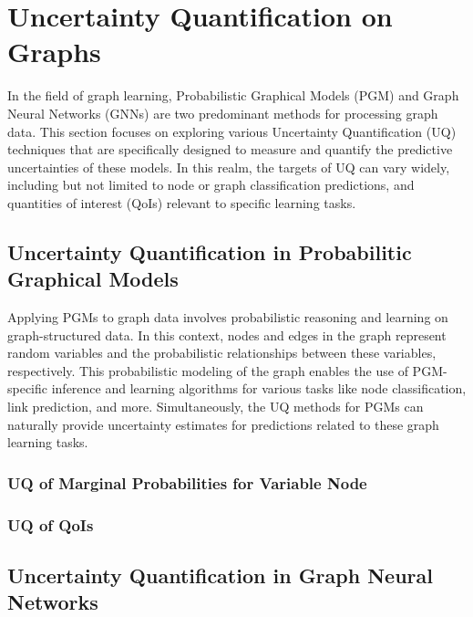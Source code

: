 \section{Uncertainty Quantification on Graphs}
In the field of graph learning, Probabilistic Graphical Models (PGM) and Graph Neural Networks (GNNs) are two predominant methods for processing graph data. 
This section focuses on exploring various Uncertainty Quantification (UQ) techniques that are specifically designed to measure and quantify the predictive uncertainties of these models. 
In this realm, the targets of UQ can vary widely, including but not limited to node or graph classification predictions, and quantities of interest (QoIs) relevant to specific learning tasks. 
\subsection{Uncertainty Quantification in Probabilitic Graphical Models}

Applying PGMs to graph data involves probabilistic reasoning and learning on graph-structured data. 
In this context, nodes and edges in the graph represent random variables and the probabilistic relationships between these variables, respectively. 
This probabilistic modeling of the graph enables the use of PGM-specific inference and learning algorithms for various tasks like node classification, link prediction, and more. 
Simultaneously, the UQ methods for PGMs can naturally provide uncertainty estimates for predictions related to these graph learning tasks. 

\subsubsection{UQ of Marginal Probabilities for Variable Node} 

\subsubsection{UQ of QoIs}
\subsection{Uncertainty Quantification in Graph Neural Networks}
